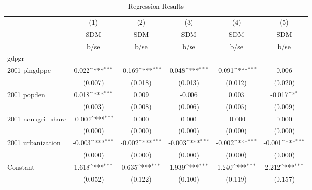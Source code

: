 \begin{table}[htbp]\centering
\def\sym#1{\ifmmode^{#1}\else\(^{#1}\)\fi}
\caption{Regression Results}
\begin{tabular}{l*{5}{c}}
\hline\hline
                    &\multicolumn{1}{c}{(1)}&\multicolumn{1}{c}{(2)}&\multicolumn{1}{c}{(3)}&\multicolumn{1}{c}{(4)}&\multicolumn{1}{c}{(5)}\\
                    &\multicolumn{1}{c}{SDM}&\multicolumn{1}{c}{SDM}&\multicolumn{1}{c}{SDM}&\multicolumn{1}{c}{SDM}&\multicolumn{1}{c}{SDM}\\
                    &        b/se         &        b/se         &        b/se         &        b/se         &        b/se         \\
\hline
gdpgr               &                     &                     &                     &                     &                     \\
2001 plngdppc       &       0.022\sym{***}&      -0.169\sym{***}&       0.048\sym{***}&      -0.091\sym{***}&       0.006         \\
                    &     (0.007)         &     (0.018)         &     (0.013)         &     (0.012)         &     (0.020)         \\
2001 popden         &       0.018\sym{***}&       0.009         &      -0.006         &       0.003         &      -0.017\sym{*}  \\
                    &     (0.003)         &     (0.008)         &     (0.006)         &     (0.005)         &     (0.009)         \\
2001 nonagri\_share  &      -0.000\sym{***}&       0.000         &       0.000         &      -0.000         &       0.000         \\
                    &     (0.000)         &     (0.000)         &     (0.000)         &     (0.000)         &     (0.000)         \\
2001 urbanization   &      -0.003\sym{***}&      -0.002\sym{***}&      -0.003\sym{***}&      -0.002\sym{***}&      -0.001\sym{***}\\
                    &     (0.000)         &     (0.000)         &     (0.000)         &     (0.000)         &     (0.000)         \\
Constant            &       1.618\sym{***}&       0.635\sym{***}&       1.939\sym{***}&       1.240\sym{***}&       2.212\sym{***}\\
                    &     (0.052)         &     (0.122)         &     (0.100)         &     (0.119)         &     (0.157)         \\

\end{tabular}
\end{table}
